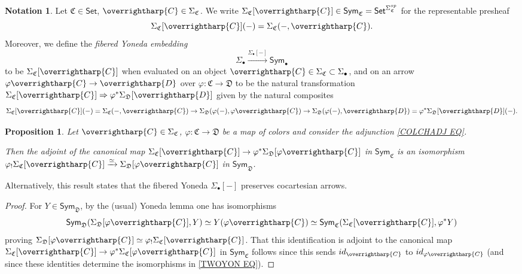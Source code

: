 \documentclass[a4paper,10pt
]{article}%
\numberwithin{equation}{section}
\numberwithin{figure}{section}
\newtheorem{proposition}[equation]{Proposition}%
\theoremstyle{definition} %
\newtheorem{notation}[equation]{Notation}%
\newcommand{\vect}[1]{\text{\overrightharp{\ensuremath{#1}}}}
\newcommand{\1}{\ensuremath{\mathbbm 1}}%
\begin{document}
\begin{notation}\label{FIBYON NOT}
	Let $\mathfrak{C} \in \mathsf{Set}$, $\vect{C} \in \Sigma_{\mathfrak{C}}$.
	We write
	$\Sigma_{\mathfrak{C}}[\vect{C}] 
	\in \mathsf{Sym}_{\mathfrak{C}} = \mathsf{Set}^{\Sigma_{\mathfrak{C}}^{op}}$ for the representable presheaf
	\[\Sigma_{\mathfrak{C}}[\vect{C}](-)
	= \Sigma_{\mathfrak{C}}(-,\vect{C}).\]
	Moreover, we define the \emph{fibered Yoneda embedding}
	\begin{equation}\label{FIBYON EQ}
	\Sigma_{\bullet} \xrightarrow{\Sigma_{\bullet}[-]} \mathsf{Sym}_{\bullet}
	\end{equation}
	to be
        $\Sigma_{\mathfrak{C}}[\vect{C}]$
	when evaluated on an object
	$\vect{C} \in \Sigma_{\mathfrak{C}} \subset \Sigma_{\bullet}$,
	and on an arrow 
	$\varphi \vect{C} \to \vect{D}$
	over $\varphi \colon \mathfrak{C} \to \mathfrak{D}$
	to be
        the natural transformation
	$\Sigma_{\mathfrak{C}}[\vect{C}]
	\Rightarrow
	\varphi^{\**}
	\Sigma_{\mathfrak{D}}[\vect{D}]
	$ given by the natural composites
	\[\Sigma_{\mathfrak{C}}[\vect{C}](-)
	= \Sigma_{\mathfrak{C}}(-,\vect{C})
	\to 
	\Sigma_{\mathfrak{D}}(\varphi(-),\varphi\vect{C})
	\to
	\Sigma_{\mathfrak{D}}(\varphi(-),\vect{D})
	=
	\varphi^{\**} \Sigma_{\mathfrak{D}}[\vect{D}](-).
	\]
\end{notation}



\begin{proposition}\label{FIBYONPUSH PROP}
	Let $\vect{C} \in \Sigma_{\mathfrak{C}}$,
	$\varphi \colon \mathfrak{C} \to \mathfrak{D}$
	be a map of colors and consider the adjunction \eqref{COLCHADJ EQ}.
	
	Then the adjoint of the canonical map
	$\Sigma_{\mathfrak{C}}[\vect{C}]
	\to
	\varphi^{\**}\Sigma_{\mathfrak{D}}[\varphi\vect{C}]$
	in $\mathsf{Sym}_{\mathfrak{C}}$
	is an isomorphism
	$\varphi_{!} \Sigma_{\mathfrak{C}}[\vect{C}]
	\xrightarrow{\simeq}
	\Sigma_{\mathfrak{D}}[\varphi\vect{C}]$
	in $\mathsf{Sym}_{\mathfrak{D}}$.
\end{proposition}


Alternatively, this result states that 
the fibered Yoneda $\Sigma_{\bullet}[-]$
preserves cocartesian arrows.


\begin{proof}
	For $Y \in \mathsf{Sym}_{\mathfrak{D}}$, by the (usual) Yoneda lemma one has isomorphisms
	\begin{equation}\label{TWOYON EQ}
	\mathsf{Sym}_{\mathfrak{D}}
	(\Sigma_{\mathfrak{D}}[\varphi \vect{C}],Y)
	\simeq
	Y(\varphi \vect{C})
	\simeq
	\mathsf{Sym}_{\mathfrak{C}}(\Sigma_{\mathfrak{C}}[\vect{C}],\varphi^{\**}Y)
	\end{equation}
	proving 
	$\Sigma_{\mathfrak{D}}[\varphi \vect{C}] \simeq \varphi_! \Sigma_{\mathfrak{C}}[\vect{C}]$.
	That this identification is adjoint to the canonical map
	$\Sigma_{\mathfrak{C}}[\vect{C}]
	\to
	\varphi^{\**}\Sigma_{\mathfrak{C}}[\varphi\vect{C}]$
	in $\mathsf{Sym}_{\mathfrak{C}}$
	follows since this sends
	$id_{\vect{C}}$ to $id_{\varphi\vect{C}}$
	(and since these identities determine the isomorphisms in \eqref{TWOYON EQ}).
\end{proof}
\end{document}
